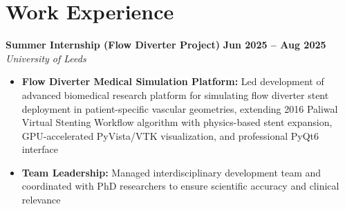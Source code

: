 \documentclass[a4paper,11pt]{article}
\begin{document}
\section{Work Experience}

\textbf{Summer Internship (Flow Diverter Project)} \hfill \textbf{Jun 2025 -- Aug 2025}\\
\textit{University of Leeds}
\begin{itemize}[leftmargin=1em, itemsep=0.05em]
    \item \textbf{Flow Diverter Medical Simulation Platform:} Led development of advanced biomedical research platform for simulating flow diverter stent deployment in patient-specific vascular geometries, extending 2016 Paliwal Virtual Stenting Workflow algorithm with physics-based stent expansion, GPU-accelerated PyVista/VTK visualization, and professional PyQt6 interface
    \item \textbf{Team Leadership:} Managed interdisciplinary development team and coordinated with PhD researchers to ensure scientific accuracy and clinical relevance
\end{itemize}
\end{document}
